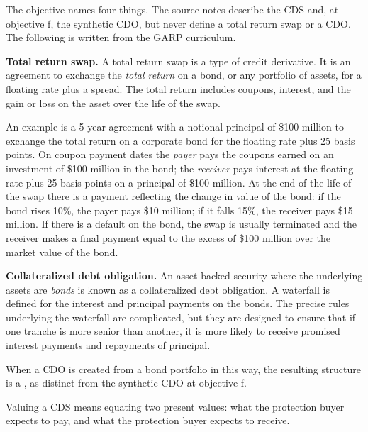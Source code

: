 \gapbadge

{\footnotesize\color{FRMGrey}The objective names four things. The source notes
describe the CDS and, at objective f, the synthetic CDO, but never define a total
return swap or a CDO. The following is written from the GARP curriculum.}

\begin{crgapbox}
\textbf{Total return swap.} A total return swap is a type of credit derivative.
It is an agreement to exchange the \emph{total return} on a bond, or any
portfolio of assets, for a floating rate plus a spread. The total return includes
coupons, interest, and the gain or loss on the asset over the life of the swap.

\smallskip
An example is a 5-year agreement with a notional principal of \$100 million to
exchange the total return on a corporate bond for the floating rate plus 25 basis
points. On coupon payment dates the \emph{payer} pays the coupons earned on an
investment of \$100 million in the bond; the \emph{receiver} pays interest at the
floating rate plus 25 basis points on a principal of \$100 million. At the end of
the life of the swap there is a payment reflecting the change in value of the
bond: if the bond rises 10\%, the payer pays \$10 million; if it falls 15\%, the
receiver pays \$15 million. If there is a default on the bond, the swap is
usually terminated and the receiver makes a final payment equal to the excess of
\$100 million over the market value of the bond.

\smallskip
\textbf{Collateralized debt obligation.} An asset-backed security where the
underlying assets are \emph{bonds} is known as a collateralized debt obligation.
A waterfall is defined for the interest and principal payments on the bonds. The
precise rules underlying the waterfall are complicated, but they are designed to
ensure that if one tranche is more senior than another, it is more likely to
receive promised interest payments and repayments of principal.

\smallskip
When a CDO is created from a bond portfolio in this way, the resulting structure
is a , as distinct from the synthetic CDO at objective f.
\end{crgapbox}


Valuing a CDS means equating two present values: what the protection buyer expects
to pay, and what the protection buyer expects to receive.

